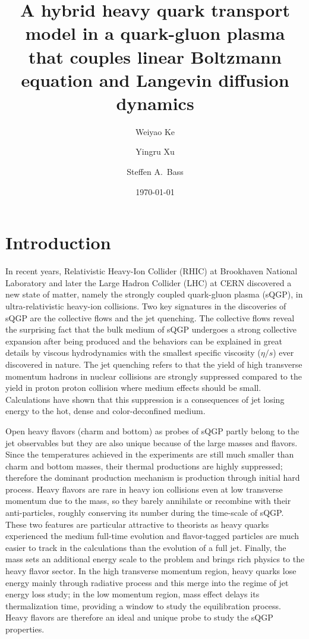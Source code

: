 \documentclass[aps, prc, reprint, amsmath, groupedaddress, nofootinbib]{revtex4-1}
\begin{document}
\title{A hybrid heavy quark transport model in a quark-gluon plasma that couples linear Boltzmann equation and Langevin diffusion dynamics}
\author{Weiyao Ke}
\author{Yingru Xu}
\author{Steffen A.\ Bass}
\date{\today}
\maketitle

\section{Introduction}
In recent years, Relativistic Heavy-Ion Collider (RHIC) at Brookhaven National Laboratory and later the Large Hadron Collider (LHC) at CERN discovered a new state of matter, namely the strongly coupled quark-gluon plasma (sQGP), in ultra-relativistic heavy-ion collisions.
Two key signatures in the discoveries of sQGP are the collective flows and the jet quenching.
The collective flows reveal the surprising fact that the bulk medium of sQGP undergoes a strong collective expansion after being produced and the behaviors can be explained in great details by viscous hydrodynamics with the smallest specific viscosity ($\eta/s$) ever discovered in nature.
The jet quenching refers to that the yield of high transverse momentum hadrons in nuclear collisions are strongly suppressed compared to the yield in proton proton collision where medium effects should be small.
Calculations have shown that this suppression is a consequences of jet losing energy to the hot, dense and color-deconfined medium. 

Open heavy flavors (charm and bottom) as probes of sQGP partly belong to the jet observables but they are also unique because of the large masses and flavors.
Since the temperatures achieved in the experiments are still much smaller than charm and bottom masses, their thermal productions are highly suppressed; 
therefore the dominant production mechanism is production through initial hard process.
Heavy flavors are rare in heavy ion collisions even at low transverse momentum due to the mass, so they barely annihilate or recombine with their anti-particles, roughly conserving its number during the time-scale of sQGP.
These two features are particular attractive to theorists as heavy quarks experienced the medium full-time evolution and flavor-tagged particles are much easier to track in the calculations than the evolution of a full jet.
Finally, the mass sets an additional energy scale to the problem and brings rich physics to the heavy flavor sector.
In the high transverse momentum region, heavy quarks lose energy mainly through radiative process and this merge into the regime of jet energy loss study;
in the low momentum region, mass effect delays its thermalization time, providing a window to study the equilibration process.
Heavy flavors are therefore an ideal and unique probe to study the sQGP properties.
\end{document}
